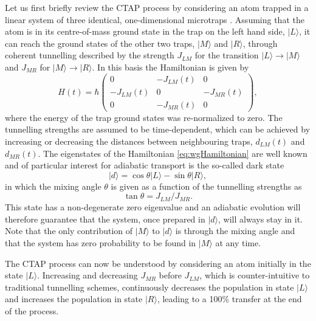 Let us first briefly review the CTAP process by considering an atom trapped in a linear system of three
identical, one-dimensional microtraps \cite{Eckert:04}.  Assuming that the atom is in its centre-of-mass ground state in the trap on the left hand side,
$|L\rangle$, it can reach the ground states of the other two traps, $|M\rangle$ and $|R\rangle$, through coherent tunnelling described by the strength $J_{LM}$ for the transition $\vert L \rangle\to\vert M \rangle$ and $J_{MR}$ for $\vert M \rangle\to\vert R
\rangle$. In this basis the Hamiltonian is given by
\begin{equation}
  \label{eq:wgHamiltonian}
  H(t)=\hbar\begin{pmatrix}
                    0             & -J_{LM}(t) & 0  \\
                   -J_{LM}(t)  & 0            & -J_{MR}(t) \\
                    0             & -J_{MR}(t) & 0  
  \end{pmatrix} ,
\end{equation}
where the energy of the trap ground states was re-normalized to zero. The tunnelling strengths are assumed to be time-dependent, which can be achieved by increasing or decreasing the distances between neighbouring traps, $d_{LM}(t)$ and $d_{MR}(t)$. The eigenstates of the Hamiltonian \eqref{eq:wgHamiltonian} are well known \cite{Bergmann:98} and of particular interest for adiabatic transport is the so-called dark state
\begin{equation}
  |d\rangle=\cos\theta|L\rangle-\sin\theta|R\rangle,
\end{equation}
in which the  mixing angle $\theta$ is given as a function of the tunnelling strengths as
\begin{equation}
  \tan\theta=J_{LM}/J_{MR}.
\end{equation}
This state has a non-degenerate zero eigenvalue and an adiabatic evolution will therefore guarantee that the system, once prepared in
$|d\rangle$, will always stay in it. Note that the only contribution of $|M\rangle$ to $|d\rangle$ is through the mixing angle and that the system has zero probability to be found in $|M\rangle$ at any time.

The CTAP process can now be understood by considering an atom initially in the state $|L\rangle$. Increasing and decreasing $J_{MR}$
before $J_{LM}$, which is counter-intuitive to traditional tunnelling schemes, continuously decreases the population in state $|L\rangle$
and increases the population in state $|R\rangle$, leading to a 100\% transfer at the end of the process.

